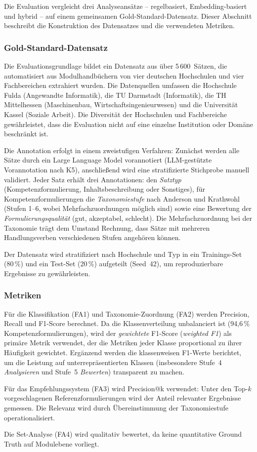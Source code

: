 Die Evaluation vergleicht drei Analyseansätze -- regelbasiert, Embedding-basiert und hybrid -- auf einem gemeinsamen Gold-Standard-Datensatz.
Dieser Abschnitt beschreibt die Konstruktion des Datensatzes und die verwendeten Metriken.

\subsubsection{Gold-Standard-Datensatz}\label{sec:gold-standard}

Die Evaluationsgrundlage bildet ein Datensatz aus über 5\,600~Sätzen, die automatisiert aus Modulhandbüchern von vier deutschen Hochschulen und vier Fachbereichen extrahiert wurden.
Die Datenquellen umfassen die Hochschule Fulda (Angewandte Informatik), die TU Darmstadt (Informatik), die TH Mittelhessen (Maschinenbau, Wirtschaftsingenieurwesen) und die Universität Kassel (Soziale Arbeit).
Die Diversität der Hochschulen und Fachbereiche gewährleistet, dass die Evaluation nicht auf eine einzelne Institution oder Domäne beschränkt ist.

Die Annotation erfolgt in einem zweistufigen Verfahren:
Zunächst werden alle Sätze durch ein Large Language Model vorannotiert (LLM-gestützte Vorannotation nach K5), anschließend wird eine stratifizierte Stichprobe manuell validiert.
Jeder Satz erhält drei Annotationen: den \emph{Satztyp} (Kompetenzformulierung, Inhaltsbeschreibung oder Sonstiges), für Kompetenzformulierungen die \emph{Taxonomiestufe} nach Anderson und Krathwohl~\cite{anderson2001taxonomy} (Stufen 1--6, wobei Mehrfachzuordnungen möglich sind) sowie eine Bewertung der \emph{Formulierungsqualität} (gut, akzeptabel, schlecht).
Die Mehrfachzuordnung bei der Taxonomie trägt dem Umstand Rechnung, dass Sätze mit mehreren Handlungsverben verschiedenen Stufen angehören können.

Der Datensatz wird stratifiziert nach Hochschule und Typ in ein Trainings-Set (80\,\%) und ein Test-Set (20\,\%) aufgeteilt (Seed~42), um reproduzierbare Ergebnisse zu gewährleisten.

\subsubsection{Metriken}\label{sec:metriken}

Für die Klassifikation (FA1) und Taxonomie-Zuordnung (FA2) werden Precision, Recall und F1-Score berechnet.
Da die Klassenverteilung unbalanciert ist (94,6\,\% Kompetenzformulierungen), wird der \emph{gewichtete} F1-Score (\emph{weighted F1}) als primäre Metrik verwendet, der die Metriken jeder Klasse proportional zu ihrer Häufigkeit gewichtet.
Ergänzend werden die klassenweisen F1-Werte berichtet, um die Leistung auf unterrepräsentierten Klassen (insbesondere Stufe~4 \emph{Analysieren} und Stufe~5 \emph{Bewerten}) transparent zu machen.

Für das Empfehlungssystem (FA3) wird Precision@k verwendet: Unter den Top-$k$ vorgeschlagenen Referenzformulierungen wird der Anteil relevanter Ergebnisse gemessen.
Die Relevanz wird durch Übereinstimmung der Taxonomiestufe operationalisiert.

Die Set-Analyse (FA4) wird qualitativ bewertet, da keine quantitative Ground Truth auf Modulebene vorliegt.
